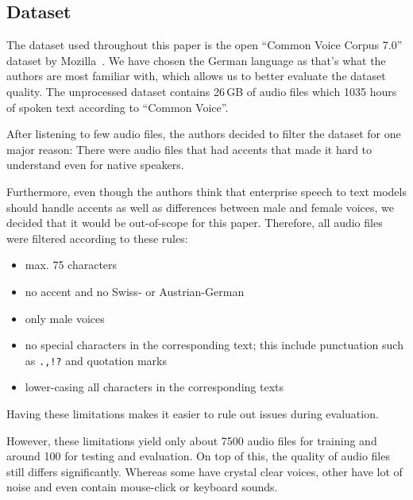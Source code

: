 \documentclass[11pt,a4paper]{article}
\begin{document}
\subsection{Dataset}
\label{subsec:dataset}

The dataset used throughout this paper is the open \enquote{Common Voice Corpus 7.0} dataset by Mozilla~\cite{commonvoice:2020}.
We have chosen the German language as that's what the authors are most familiar with, which allows us to better evaluate the dataset quality.
The unprocessed dataset contains 26\,GB of audio files which 1035 hours of spoken text according to \enquote{Common Voice}.

After listening to few audio files, the authors decided to filter the dataset for one major reason:
There were audio files that had accents that made it hard to understand even for native speakers.

Furthermore, even though the authors think that enterprise speech to text models
should handle accents as well as differences between male and female voices,
we decided that it would be out-of-scope for this paper.
Therefore, all audio files were filtered according to these rules:

\begin{itemize}
    \item max. 75 characters
    \item no accent and no Swiss- or Austrian-German
    \item only male voices
    \item no special characters in the corresponding text;\newline 
          this include punctuation such as \texttt{.,!?} and quotation marks
    \item lower-casing all characters in the corresponding texts
\end{itemize}

Having these limitations makes it easier to rule out issues during evaluation.

However, these limitations yield only about 7500 audio files for training and around 100 for testing and evaluation.
On top of this, the quality of audio files still differs significantly.
Whereas some have crystal clear voices, other have lot of noise and even contain mouse-click or keyboard sounds.
\end{document}
